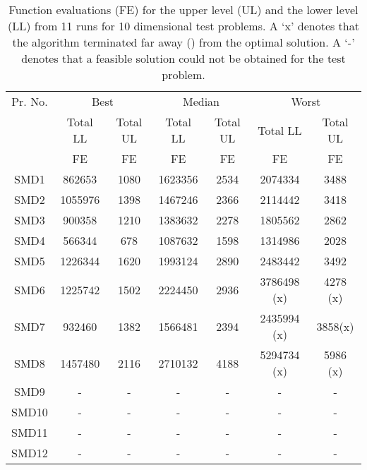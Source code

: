 \documentclass[twoside]{article}
\begin{document}
\begin{table*}[hbt]
\caption{Function evaluations (FE) for the upper level (UL) and the lower level (LL) from 11
  runs for 10 dimensional test problems. A `x' denotes that the algorithm terminated far away () from the optimal solution. A `-' denotes that a feasible solution could not be obtained for the test problem.} 
\label{tab:table2a}
{\small\begin{center}
\begin{tabular}{|c|c|c|c|c|c|c|} \hline
Pr. No.	&	\multicolumn{2}{|c|}{Best}	&	\multicolumn{2}{|c|}{Median}	&	\multicolumn{2}{|c|}{Worst}	\\	\cline{2-7}
	&		\multicolumn{1}{|c|}{Total LL}	&	\multicolumn{1}{|c|}{Total UL}	&	\multicolumn{1}{|c|}{Total LL}	&	\multicolumn{1}{|c|}{Total UL}	&	\multicolumn{1}{|c|}{Total LL}	&\multicolumn{1}{|c|}{Total UL}	\\	
	&	\multicolumn{1}{|c|}{FE} 	&
        \multicolumn{1}{|c|}{FE}	&\multicolumn{1}{|c|}{FE}         &\multicolumn{1}{|c|}{FE}        &
        \multicolumn{1}{|c|}{FE}& \multicolumn{1}{|c|}{FE}	\\ \hline	
SMD1 & 862653 & 1080 & 1623356 & 2534 & 2074334 & 3488	\\	\hline
SMD2 & 1055976 & 1398 & 1467246 & 2366 & 2114442 & 3418	\\	\hline
SMD3 & 900358 & 1210 & 1383632 & 2278 & 1805562 & 2862	\\	\hline
SMD4 & 566344 & 678 & 1087632 & 1598 & 1314986 & 2028	\\	\hline
SMD5 & 1226344 & 1620 & 1993124 & 2890 & 2483442 & 3492	\\	\hline
SMD6 & 1225742 & 1502 & 2224450 & 2936 & 3786498 (x) & 4278 (x)	\\	\hline
SMD7 & 932460 & 1382 & 1566481 & 2394 & 2435994 (x) & 3858(x) \\	\hline
SMD8 & 1457480 & 2116 & 2710132 & 4188 & 5294734 (x) & 5986 (x)  \\	\hline
SMD9 & - & - & - & - & - & -  \\	\hline
SMD10 & - & - & - & - & - & -  \\	\hline
SMD11 & -& -& -& -& -& - \\ \hline
SMD12 & -& -& -& -& -& - \\ \hline
\end{tabular}
\end{center}}
\end{table*}
\end{document}
